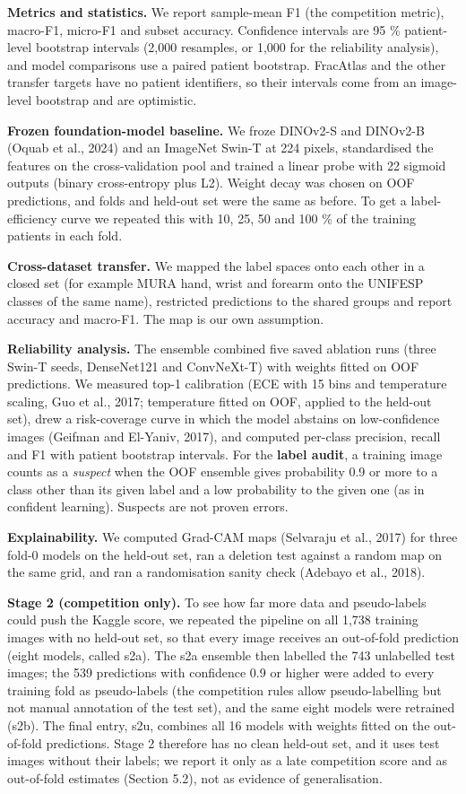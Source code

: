 \textbf{Metrics and statistics.} We report sample-mean F1 (the competition metric), macro-F1, micro-F1 and subset accuracy. Confidence intervals are 95 \% patient-level bootstrap intervals (2,000 resamples, or 1,000 for the reliability analysis), and model comparisons use a paired patient bootstrap. FracAtlas and the other transfer targets have no patient identifiers, so their intervals come from an image-level bootstrap and are optimistic.

\textbf{Frozen foundation-model baseline.} We froze DINOv2-S and DINOv2-B (Oquab et al., 2024) and an ImageNet Swin-T at 224 pixels, standardised the features on the cross-validation pool and trained a linear probe with 22 sigmoid outputs (binary cross-entropy plus L2). Weight decay was chosen on OOF predictions, and folds and held-out set were the same as before. To get a label-efficiency curve we repeated this with 10, 25, 50 and 100 \% of the training patients in each fold.

\textbf{Cross-dataset transfer.} We mapped the label spaces onto each other in a closed set (for example MURA hand, wrist and forearm onto the UNIFESP classes of the same name), restricted predictions to the shared groups and report accuracy and macro-F1. The map is our own assumption.

\textbf{Reliability analysis.} The ensemble combined five saved ablation runs (three Swin-T seeds, DenseNet121 and ConvNeXt-T) with weights fitted on OOF predictions. We measured top-1 calibration (ECE with 15 bins and temperature scaling, Guo et al., 2017; temperature fitted on OOF, applied to the held-out set), drew a risk-coverage curve in which the model abstains on low-confidence images (Geifman and El-Yaniv, 2017), and computed per-class precision, recall and F1 with patient bootstrap intervals. For the \textbf{label audit}, a training image counts as a \emph{suspect} when the OOF ensemble gives probability 0.9 or more to a class other than its given label and a low probability to the given one (as in confident learning). Suspects are not proven errors.

\textbf{Explainability.} We computed Grad-CAM maps (Selvaraju et al., 2017) for three fold-0 models on the held-out set, ran a deletion test against a random map on the same grid, and ran a randomisation sanity check (Adebayo et al., 2018).

\textbf{Stage 2 (competition only).} To see how far more data and pseudo-labels could push the Kaggle score, we repeated the pipeline on all 1,738 training images with no held-out set, so that every image receives an out-of-fold prediction (eight models, called s2a). The s2a ensemble then labelled the 743 unlabelled test images; the 539 predictions with confidence 0.9 or higher were added to every training fold as pseudo-labels (the competition rules allow pseudo-labelling but not manual annotation of the test set), and the same eight models were retrained (s2b). The final entry, s2u, combines all 16 models with weights fitted on the out-of-fold predictions. Stage 2 therefore has no clean held-out set, and it uses test images without their labels; we report it only as a late competition score and as out-of-fold estimates (Section 5.2), not as evidence of generalisation.

